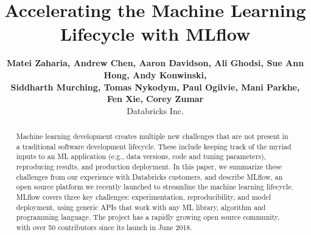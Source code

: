 \documentclass[11pt]{article}
\begin{document}
\title{Accelerating the Machine Learning Lifecycle with MLflow}

%

\author{
  \textbf{Matei Zaharia, Andrew Chen, Aaron Davidson, Ali Ghodsi, Sue Ann Hong, Andy Konwinski,}\\
  \textbf{Siddharth Murching, Tomas Nykodym, Paul Ogilvie, Mani Parkhe, Fen Xie, Corey Zumar} \\
  Databricks Inc.\\
}

\maketitle

\begin{abstract}
Machine learning development creates multiple new challenges that are not present in a traditional software development lifecycle.
These include keeping track of the myriad inputs to an ML application (e.g., data versions, code and tuning parameters), reproducing results, and production deployment.
In this paper, we summarize these challenges from our experience with Databricks customers, and describe MLflow, an open source platform we recently launched to streamline the machine learning lifecycle.
MLflow covers three key challenges: experimentation, reproducibility, and model deployment, using generic APIs that work with any ML library, algorithm and programming language.
The project has a rapidly growing open source community, with over 50 contributors since its launch in June 2018.
\end{abstract}
\end{document}
